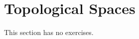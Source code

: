 \documentclass[../../master.tex]{subfiles}
\begin{document}
\section{Topological Spaces}

This section has no exercises.
\end{document}
